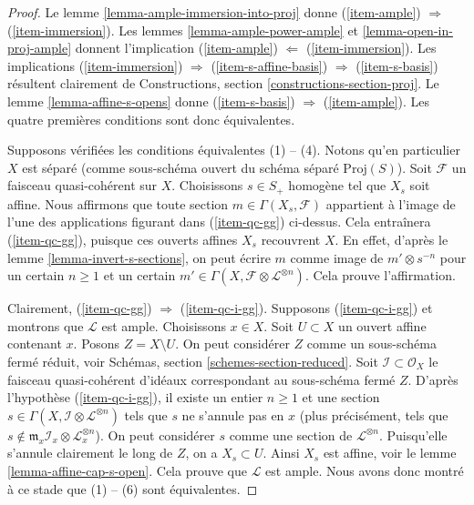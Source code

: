 \begin{proof}
Le lemme \ref{lemma-ample-immersion-into-proj} donne
(\ref{item-ample}) $\Rightarrow$ (\ref{item-immersion}).
Les lemmes \ref{lemma-ample-power-ample} et \ref{lemma-open-in-proj-ample}
donnent l'implication
(\ref{item-ample}) $\Leftarrow$ (\ref{item-immersion}).
Les implications (\ref{item-immersion}) $\Rightarrow$
(\ref{item-s-affine-basis}) $\Rightarrow$ (\ref{item-s-basis})
résultent clairement de Constructions, section \ref{constructions-section-proj}.
Le lemme \ref{lemma-affine-s-opens} donne
(\ref{item-s-basis}) $\Rightarrow$ (\ref{item-ample}).
Les quatre premières conditions sont donc équivalentes.

\medskip\noindent
Supposons vérifiées les conditions équivalentes (1) --
(4). Notons qu'en particulier $X$ est séparé (comme
sous-schéma ouvert du schéma séparé $\text{Proj}(S)$).
Soit $\mathcal{F}$ un faisceau quasi-cohérent sur $X$.
Choisissons $s \in S_{+}$ homogène tel que $X_s$ soit affine.
Nous affirmons que toute section $m \in \Gamma(X_s, \mathcal{F})$
appartient à l'image de l'une des applications figurant dans
(\ref{item-qc-gg}) ci-dessus. Cela entraînera (\ref{item-qc-gg}),
puisque ces ouverts affines $X_s$ recouvrent $X$.
En effet, d'après le lemme \ref{lemma-invert-s-sections}, on peut écrire
$m$ comme image de $m' \otimes s^{-n}$ pour un certain
$n \geq 1$ et un certain
$m' \in \Gamma(X, \mathcal{F} \otimes \mathcal{L}^{\otimes n})$.
Cela prouve l'affirmation.

\medskip\noindent
Clairement, (\ref{item-qc-gg}) $\Rightarrow$ (\ref{item-qc-i-gg}).
Supposons (\ref{item-qc-i-gg}) et montrons que $\mathcal{L}$ est
ample. Choisissons $x \in X$. Soit $U \subset X$ un ouvert
affine contenant $x$. Posons $Z = X \setminus U$. On peut considérer
$Z$ comme un sous-schéma fermé réduit,
voir Schémas, section \ref{schemes-section-reduced}.
Soit $\mathcal{I} \subset \mathcal{O}_X$ le faisceau
quasi-cohérent d'idéaux correspondant au sous-schéma fermé $Z$.
D'après l'hypothèse (\ref{item-qc-i-gg}), il existe un entier $n \geq 1$ et une section
$s \in \Gamma(X, \mathcal{I} \otimes \mathcal{L}^{\otimes n})$
tels que $s$ ne s'annule pas en $x$ (plus précisément, tels que
$s \not \in \mathfrak m_x \mathcal{I}_x \otimes \mathcal{L}_x^{\otimes n}$).
On peut considérer $s$ comme une section de $\mathcal{L}^{\otimes n}$.
Puisqu'elle s'annule clairement le long de $Z$, on a
$X_s \subset U$. Ainsi $X_s$ est affine, voir
le lemme \ref{lemma-affine-cap-s-open}.
Cela prouve que $\mathcal{L}$ est ample.
Nous avons donc montré à ce stade que (1) -- (6) sont équivalentes.


\end{proof}
